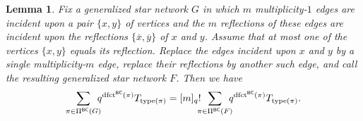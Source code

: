 \documentclass[12pt]{amsart}
\newtheorem{lem}[thm]{Lemma}
\theoremstyle{definition}
\numberwithin{equation}{section}
\newcommand{\ol}[1]{\overline{#1}}
\newcommand{\dfct}{\mathrm{dfct}}
\newcommand{\type}{\mathrm{type}}
\newcommand{\nTksp}{\negthickspace\negthickspace}
\newcommand{\PiBC}{\Pi^{\msfBC}}
\newcommand{\msfBC}{\mathsf{BC}}
\begin{document}
\begin{lem}\label{l:collapse}
Fix a generalized star network $G$ in which $m$ multiplicity-$1$ edges are incident upon a pair $\{x,y\}$ of vertices and the $m$ reflections of these edges are incident upon the reflections $\{\ol x, \ol y\}$ of $x$ and $y$. Assume that at most one of the vertices $\{ x, y \}$ equals its reflection. Replace the edges incident upon $x$ and $y$
by a single multiplicity-$m$ edge,
replace their reflections by another such edge, and call the resulting generalized star network $F$.
Then we have
\begin{equation}\label{eq:mto1}
        \sum_{\pi \in \PiBC(G)} \nTksp q^{\dfct^{\msfBC}(\pi)} T_{\type(\pi)} = 
    [m]_q! \nTksp
    \sum_{\pi \in \PiBC(F)} \nTksp q^{\dfct^{\msfBC}(\pi)} T_{\type(\pi)}.
\end{equation}
\end{lem}
\end{document}
